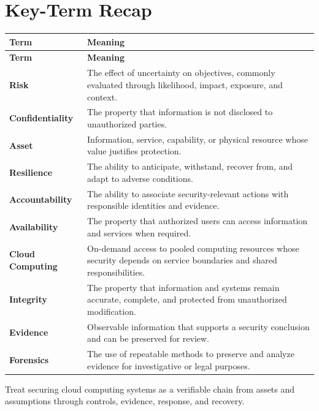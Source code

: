\documentclass[11pt]{article}
\begin{document}
\section*{Key-Term Recap}
\begin{longtable}{>{\RaggedRight\arraybackslash}p{}>{\RaggedRight\arraybackslash}p{}}
\toprule\rowcolor{Navy}\color{white}\textbf{Term} & \color{white}\textbf{Meaning}\\\midrule
\endfirsthead
\toprule\rowcolor{Navy}\color{white}\textbf{Term} & \color{white}\textbf{Meaning}\\\midrule
\endhead
\textbf{Risk} & The effect of uncertainty on objectives, commonly evaluated through likelihood, impact, exposure, and context. \\\midrule
\textbf{Confidentiality} & The property that information is not disclosed to unauthorized parties. \\\midrule
\textbf{Asset} & Information, service, capability, or physical resource whose value justifies protection. \\\midrule
\textbf{Resilience} & The ability to anticipate, withstand, recover from, and adapt to adverse conditions. \\\midrule
\textbf{Accountability} & The ability to associate security-relevant actions with responsible identities and evidence. \\\midrule
\textbf{Availability} & The property that authorized users can access information and services when required. \\\midrule
\textbf{Cloud Computing} & On-demand access to pooled computing resources whose security depends on service boundaries and shared responsibilities. \\\midrule
\textbf{Integrity} & The property that information and systems remain accurate, complete, and protected from unauthorized modification. \\\midrule
\textbf{Evidence} & Observable information that supports a security conclusion and can be preserved for review. \\\midrule
\textbf{Forensics} & The use of repeatable methods to preserve and analyze evidence for investigative or legal purposes. \\\midrule
\bottomrule
\end{longtable}
\begin{takeawaybox}
Treat securing cloud computing systems as a verifiable chain from assets and assumptions through controls, evidence, response, and recovery.
\end{takeawaybox}
\end{document}
